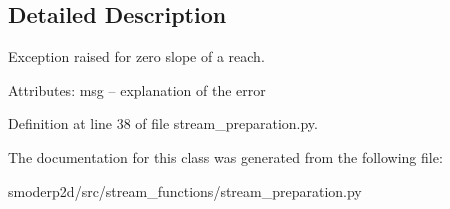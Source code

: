 \subsection{Detailed Description}
\begin{DoxyVerb}Exception raised for zero slope of a reach.

Attributes:
    msg  -- explanation of the error
\end{DoxyVerb}
 

Definition at line 38 of file stream\-\_\-preparation.\-py.



The documentation for this class was generated from the following file\-:\begin{DoxyCompactItemize}
\item 
smoderp2d/src/stream\-\_\-functions/stream\-\_\-preparation.\-py\end{DoxyCompactItemize}
